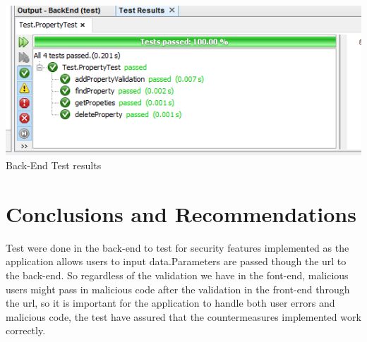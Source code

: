 \documentclass[a4paper,12pt]{article}
\begin{document}
\includegraphics[width=1\textwidth]{./Images/testResults.png}\\
Back-End Test results \\


\section{Conclusions and Recommendations}
Test were done in the back-end to test for security features implemented as the application allows users to input data.Parameters are passed though the url to the back-end. So regardless of the validation we have in the font-end, malicious users might pass in  malicious code after the validation in the front-end through the url, so it is important for the application to handle both user errors and malicious code, the test have assured that the countermeasures implemented work correctly.
\end{document}

